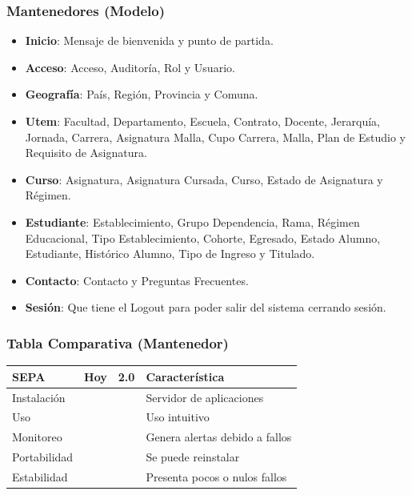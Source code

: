 \documentclass{beamer}
\newcommand{\cmark}{\ding{51}}%
\newcommand{\xmark}{\ding{55}}%
\begin{document}

\begin{frame}
\frametitle{Mantenedores (Modelo)}
\begin{itemize}
\item \textbf{Inicio}: Mensaje de bienvenida y punto de partida.
\item \textbf{Acceso}: Acceso, Auditoría, Rol y Usuario.
\item \textbf{Geografía}: País, Región, Provincia y Comuna.
\item \textbf{Utem}: Facultad, Departamento, Escuela, Contrato, Docente, Jerarquía, Jornada, Carrera, Asignatura Malla, Cupo Carrera, Malla, Plan de Estudio y Requisito de Asignatura.
\item \textbf{Curso}: Asignatura, Asignatura Cursada, Curso, Estado de Asignatura y Régimen.
\item \textbf{Estudiante}: Establecimiento, Grupo Dependencia, Rama, Régimen Educacional, Tipo Establecimiento, Cohorte, Egresado, Estado Alumno, Estudiante, Histórico Alumno, Tipo de Ingreso y Titulado.
\item \textbf{Contacto}: Contacto y Preguntas Frecuentes.
\item \textbf{Sesión}: Que tiene el Logout para poder salir del sistema cerrando sesión.
\end{itemize}
\end{frame}


\begin{frame}
\frametitle{Tabla Comparativa (Mantenedor)}
\begin{table}
\begin{tabular}{l l l l}
\toprule
\textbf{SEPA} & \textbf{Hoy} & \textbf{2.0} & Característica\\
\midrule
Instalación 	& \textcolor{green}{\cmark} & \textcolor{green}{\cmark} & Servidor de aplicaciones  \\
Uso		 		& \textcolor{green}{\cmark} & \textcolor{green}{\cmark} & Uso intuitivo \\
Monitoreo 		& \textcolor{green}{\cmark} & \textcolor{green}{\cmark} & Genera alertas debido a fallos \\
Portabilidad 	& \textcolor{red}{\xmark}   & \textcolor{green}{\cmark} & Se puede reinstalar \\
Estabilidad 	& \textcolor{red}{\xmark}   & \textcolor{green}{\cmark} & Presenta pocos o nulos fallos \\
\bottomrule
\end{tabular}
\end{table}
\end{frame}
\end{document}
